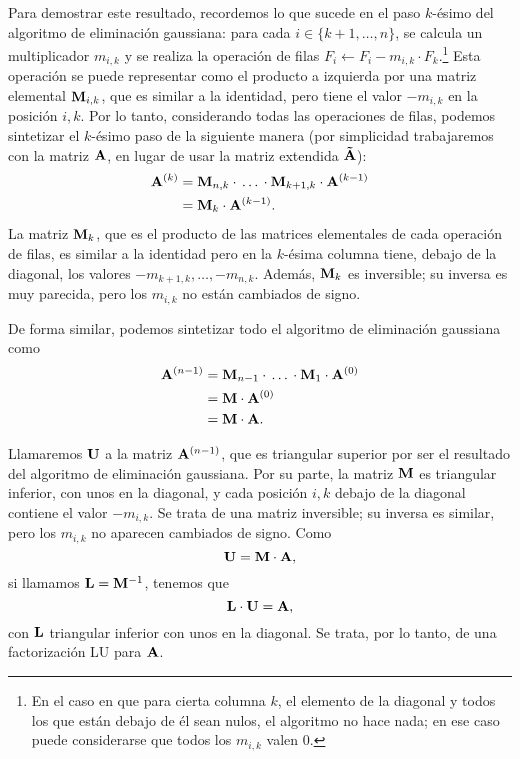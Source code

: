 Para demostrar este resultado, recordemos lo que sucede en el paso $k$-ésimo
del algoritmo de eliminación gaussiana: para cada $i \in \{k+1,\dots,n\}$,
se calcula un multiplicador $m_{i,k}$ y se realiza la operación de filas
$F_i \gets F_i - m_{i,k} \cdot F_k$.\footnote{En el caso en que para cierta
columna $k$, el elemento de la diagonal y todos los que están debajo de él
sean nulos, el algoritmo no hace nada; en ese caso puede considerarse
que todos los $m_{i,k}$ valen $0$.}
Esta operación se puede representar como
el producto a izquierda por una matriz elemental $\mathbf{M}_{i,k}$, que es
similar a la identidad, pero tiene el valor $-m_{i,k}$ en la posición $i,k$.
Por lo tanto, considerando todas las operaciones de filas, podemos sintetizar
el $k$-ésimo paso de la siguiente manera (por simplicidad trabajaremos con la
matriz $\mathbf{A}$, en lugar de usar la matriz extendida $\mathbf{\tilde A}$):
\[ \begin{aligned}
    \mathbf{A}^{(k)}
    &= \mathbf{M}_{n,k} \cdot \, \dots \, \cdot \mathbf{M}_{k+1,k} \cdot \mathbf{A}^{(k-1)} \\
    &= \mathbf{M}_{k} \cdot \mathbf{A}^{(k-1)}.
\end{aligned} \]
La matriz $\mathbf{M}_{k}$, que es el producto de las matrices elementales
de cada operación de filas, es similar a la identidad pero en la $k$-ésima
columna tiene, debajo de la diagonal, los valores
$-m_{k+1,k}, \dots, -m_{n,k}$. Además, $\mathbf{M}_{k}$ es inversible; su inversa
es muy parecida, pero los $m_{i,k}$ no están cambiados de signo.

De forma similar, podemos sintetizar todo el algoritmo de eliminación
gaussiana como
\[ \begin{aligned}
    \mathbf{A}^{(n-1)}
    &= \mathbf{M}_{n-1} \cdot \, \dots \, \cdot \mathbf{M}_{1} \cdot \mathbf{A}^{(0)} \\
    &= \mathbf{M} \cdot \mathbf{A}^{(0)} \\
    &= \mathbf{M} \cdot \mathbf{A}.
\end{aligned} \]

Llamaremos $\mathbf{U}$ a la matriz $\mathbf{A}^{(n-1)}$, que es triangular superior
por ser el resultado del algoritmo de eliminación gaussiana. Por su parte,
la matriz $\mathbf{M}$ es triangular inferior, con unos en la diagonal, y
cada posición $i,k$ debajo de la diagonal contiene el valor $-m_{i,k}$. Se
trata de una matriz inversible; su inversa es similar, pero los $m_{i,k}$
no aparecen cambiados de signo. Como
\[ \mathbf{U} = \mathbf{M} \cdot \mathbf{A}, \]
si llamamos $\mathbf{L} = \mathbf{M}^{-1}$, tenemos que
\[ \mathbf{L} \cdot \mathbf{U} = \mathbf{A}, \]
con $\mathbf{L}$ triangular inferior con unos en la diagonal. Se trata, por lo
tanto, de una factorización LU para $\mathbf{A}$.

